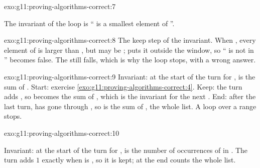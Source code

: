 \begin{solution}{exo:g11:proving-algorithms-correct:7}
\smallskip\noindent\hspace*{2em}

\noindent\hspace*{4em}

\noindent\hspace*{4em}

\noindent\hspace*{6em}

\noindent\hspace*{8em}

\noindent\hspace*{4em}

\noindent\hspace*{4em}

\smallskip\noindent The invariant of the loop is `` is a smallest element of ''.
\end{solution}

\begin{solution}{exo:g11:proving-algorithms-correct:8}
The keep step of the invariant. When , every element of  is larger than , but
 may be ;  puts it outside the window, so `` is not in
'' becomes false. The  still falls, which is why the loop stops, with a wrong answer.
\end{solution}

\begin{solution}{exo:g11:proving-algorithms-correct:9}
Invariant: at the start of the turn for ,  is the sum of . Start: exercise
\ref{exo:g11:proving-algorithms-correct:4}. Keep: the turn adds , so  becomes the sum of
, which is the invariant for the next . End: after the last turn,  has gone through
, so  is the sum of , the whole list. A  loop over a range stops.
\end{solution}

\begin{solution}{exo:g11:proving-algorithms-correct:10}
\smallskip\noindent\hspace*{2em}

\noindent\hspace*{2em}

\noindent\hspace*{4em}

\noindent\hspace*{6em}

\smallskip\noindent Invariant: at the start of the turn for ,  is the number of occurrences of
 in . The turn adds $1$ exactly when  is , so it is kept; at the end 
counts the whole list.
\end{solution}

